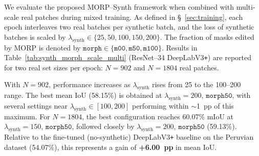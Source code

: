 \documentclass[12pt]{article}
\begin{document}
We evaluate the proposed MORP--Synth framework when combined with multi-scale real patches during mixed training. 
As defined in §~\ref{sec:training}, each epoch interleaves two real batches per synthetic batch, and the loss of synthetic batches is scaled by 
$\lambda_{\text{synth}} \in \{25, 50, 100, 150, 200\}$. 
The fraction of masks edited by MORP is denoted by $\texttt{morph} \in \{\texttt{m00}, \texttt{m50}, \texttt{m100}\}$.
Results in Table~\ref{tab:synth_morph_scale_multi} (ResNet--34 DeepLabV3\texttt{+}) are reported for two real set sizes per epoch: 
$N{=}902$ and $N{=}1804$ real patches.

With $N{=}902$, performance increases as $\lambda_{\text{synth}}$ rises from 25 to the 100--200 range. 
The best mean IoU (58.15\%) is obtained at $\lambda_{\text{synth}}{=}200$, $\texttt{morph50}$, 
with several settings near $\lambda_{\text{synth}}\in[100,200]$ performing within $\sim$1~pp of this maximum.  
For $N{=}1804$, the best configuration reaches 60.07\% mIoU at $\lambda_{\text{synth}}{=}150$, $\texttt{morph50}$, 
followed closely by $\lambda_{\text{synth}}{=}200$, $\texttt{morph50}$ (59.13\%).  
Relative to the fine-tuned (no-synthetic) DeepLabV3\texttt{+} baseline on the Peruvian dataset (54.07\%), 
this represents a gain of \textbf{+6.00~pp} in mean IoU.
\end{document}
